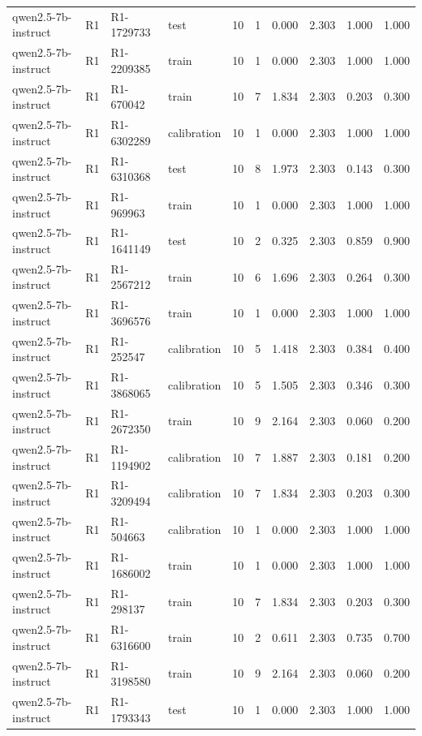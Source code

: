 \begin{table}
\begin{tabular}{llllrrrrrr}
qwen2.5-7b-instruct & R1 & R1-1729733 & test & 10 & 1 & 0.000 & 2.303 & 1.000 & 1.000 \\
qwen2.5-7b-instruct & R1 & R1-2209385 & train & 10 & 1 & 0.000 & 2.303 & 1.000 & 1.000 \\
qwen2.5-7b-instruct & R1 & R1-670042 & train & 10 & 7 & 1.834 & 2.303 & 0.203 & 0.300 \\
qwen2.5-7b-instruct & R1 & R1-6302289 & calibration & 10 & 1 & 0.000 & 2.303 & 1.000 & 1.000 \\
qwen2.5-7b-instruct & R1 & R1-6310368 & test & 10 & 8 & 1.973 & 2.303 & 0.143 & 0.300 \\
qwen2.5-7b-instruct & R1 & R1-969963 & train & 10 & 1 & 0.000 & 2.303 & 1.000 & 1.000 \\
qwen2.5-7b-instruct & R1 & R1-1641149 & test & 10 & 2 & 0.325 & 2.303 & 0.859 & 0.900 \\
qwen2.5-7b-instruct & R1 & R1-2567212 & train & 10 & 6 & 1.696 & 2.303 & 0.264 & 0.300 \\
qwen2.5-7b-instruct & R1 & R1-3696576 & train & 10 & 1 & 0.000 & 2.303 & 1.000 & 1.000 \\
qwen2.5-7b-instruct & R1 & R1-252547 & calibration & 10 & 5 & 1.418 & 2.303 & 0.384 & 0.400 \\
qwen2.5-7b-instruct & R1 & R1-3868065 & calibration & 10 & 5 & 1.505 & 2.303 & 0.346 & 0.300 \\
qwen2.5-7b-instruct & R1 & R1-2672350 & train & 10 & 9 & 2.164 & 2.303 & 0.060 & 0.200 \\
qwen2.5-7b-instruct & R1 & R1-1194902 & calibration & 10 & 7 & 1.887 & 2.303 & 0.181 & 0.200 \\
qwen2.5-7b-instruct & R1 & R1-3209494 & calibration & 10 & 7 & 1.834 & 2.303 & 0.203 & 0.300 \\
qwen2.5-7b-instruct & R1 & R1-504663 & calibration & 10 & 1 & 0.000 & 2.303 & 1.000 & 1.000 \\
qwen2.5-7b-instruct & R1 & R1-1686002 & train & 10 & 1 & 0.000 & 2.303 & 1.000 & 1.000 \\
qwen2.5-7b-instruct & R1 & R1-298137 & train & 10 & 7 & 1.834 & 2.303 & 0.203 & 0.300 \\
qwen2.5-7b-instruct & R1 & R1-6316600 & train & 10 & 2 & 0.611 & 2.303 & 0.735 & 0.700 \\
qwen2.5-7b-instruct & R1 & R1-3198580 & train & 10 & 9 & 2.164 & 2.303 & 0.060 & 0.200 \\
qwen2.5-7b-instruct & R1 & R1-1793343 & test & 10 & 1 & 0.000 & 2.303 & 1.000 & 1.000 \\

\end{tabular}
\end{table}
